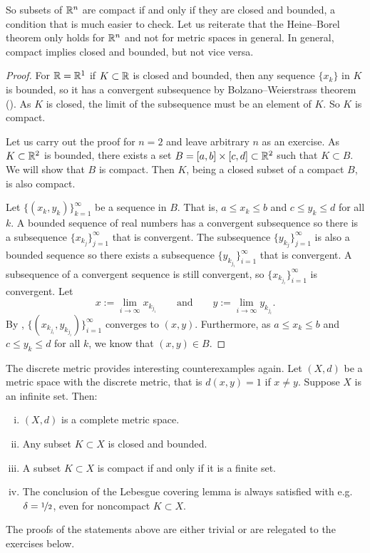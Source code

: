 So subsets of ${\mathbb{R}}^n$ are compact if and only if they are closed and bounded,
a condition that is much easier to check.
Let us reiterate that the Heine--Borel theorem only holds for ${\mathbb{R}}^n$ and not
for metric spaces in general.  In general, compact implies closed and
bounded, but not vice versa.

\begin{proof}
For ${\mathbb{R}} = {\mathbb{R}}^1$ if $K \subset {\mathbb{R}}$ is closed and bounded, then
any sequence $\{ x_k \}$ in $K$ is bounded, so it has a convergent
subsequence by
Bolzano--Weierstrass theorem ().
As $K$ is closed, the limit of the subsequence must be an element of
$K$.  So $K$ is compact.

Let us carry out the proof for $n=2$ and leave arbitrary $n$ as an exercise.
As $K \subset {\mathbb{R}}^2$ is bounded, there exists a set
$B=[a,b]\times[c,d] \subset {\mathbb{R}}^2$ such that $K \subset B$.  We will show
that $B$ is compact.  Then $K$, being a closed subset of a compact $B$, is
also compact.  

Let $\{ (x_k,y_k) \}_{k=1}^\infty$ be a sequence in $B$.  That is,
$a \leq x_k \leq b$ and
$c \leq y_k \leq d$ for all $k$.  A bounded sequence of real numbers
has a convergent
subsequence so there is a subsequence $\{ x_{k_j} \}_{j=1}^\infty$
that is convergent.  The subsequence 
$\{ y_{k_j} \}_{j=1}^\infty$ is also a bounded sequence so there exists
a subsequence
$\{ y_{k_{j_i}} \}_{i=1}^\infty$ that is convergent.  A subsequence of a
convergent sequence is still convergent, so 
$\{ x_{k_{j_i}} \}_{i=1}^\infty$ is convergent.
Let
\begin{equation*}
x := \lim_{i\to\infty} x_{k_{j_i}}
\qquad \text{and} \qquad
y := \lim_{i\to\infty} y_{k_{j_i}} .
\end{equation*}
By ,
$\bigl\{ (x_{k_{j_i}},y_{k_{j_i}}) \bigr\}_{i=1}^\infty$ converges to $(x,y)$.
Furthermore, as $a \leq x_k \leq b$ and
$c \leq y_k \leq d$ for all $k$, we know that $(x,y) \in B$.
\end{proof}

\begin{example}
The discrete metric provides interesting counterexamples again.
Let $(X,d)$ be a metric space with the discrete metric, that is $d(x,y) = 1$
if $x \not= y$.  Suppose
$X$ is an infinite set.  Then:
\begin{enumerate}[(i)]
\item $(X,d)$ is a complete metric space.
\item Any subset $K \subset X$ is closed and bounded.
\item A subset $K \subset X$ is compact if and only if it is a finite set.
\item The conclusion of the Lebesgue covering lemma is always satisfied with
e.g. $\delta = \nicefrac{1}{2}$, even for noncompact $K \subset X$.
\end{enumerate}
The proofs
of the statements above are either trivial or are relegated to the exercises
below.
\end{example}

